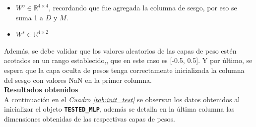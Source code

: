\documentclass{article}
\begin{document}
\begin{itemize}
    \item $W^{o}\in\mathbb{R}^{4 \times 4}$, recordando que fue agregada la columna de sesgo, por eso se suma 1 a $D$ y $M$.
    \item $W^{s}\in\mathbb{R}^{4 \times 2}$
\end{itemize}

\noindent
Además, se debe validar que los valores aleatorios de las capas de peso estén acotados en un rango establecido,, que en este caso es [-0.5, 0.5]. Y por último, se espera que la capa oculta de pesos tenga correctamente inicializada la columna del sesgo con valores NaN en la primer columna.\\

\noindent
\textbf{Resultados obtenidos}
\\
A continuación en el \textit{Cuadro \ref{tab:init_test}} se observan los datos obtenidos al inicializar el objeto \textbf{\texttt{TESTED\_MLP}}, además se detalla en la última columna las dimensiones obtenidas de las respectivas capas de pesos.
\end{document}
